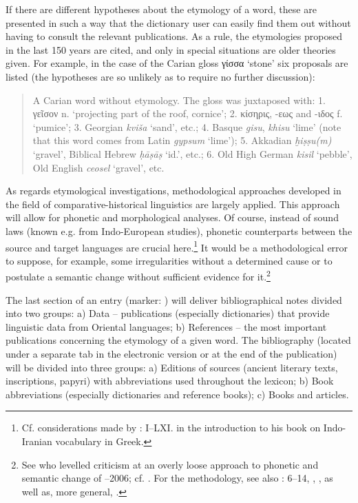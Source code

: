 \documentclass[output=paper,colorlinks,citecolor=brown,arabicfont,chinesefont]{langscibook}
\begin{document}
If there are different hypotheses about the etymology of a word, these are presented in such a way that the dictionary user can easily find them out without having to consult the relevant publications. As a rule, the etymologies proposed in the last 150 years are cited, and only in special situations are older theories given. For example, in the case of the Carian gloss γίσσα ‘stone’ six proposals are listed (the hypotheses are so unlikely as to require no further discussion):

\begin{quote}
     A Carian word without etymology. The gloss was juxtaposed with: 1. γεῖσον n. ‘projecting part of the roof, cornice’; 2. κίσηρις, -εως and -ιδος f. ‘pumice’; 3. Georgian \emph{kviša} ‘sand’, etc.; 4. Basque \emph{gisu}, \emph{khisu} ‘lime’ (note that this word comes from Latin \emph{gypsum} ‘lime’); 5. Akkadian \emph{ḫiṣṣu(m)} ‘gravel’, Biblical Hebrew \emph{ḥāṣāṣ} ‘id.’, etc.; 6. Old High German \emph{kisil} ‘pebble’, Old English \emph{ceosel} ‘gravel’, etc.
\end{quote}

As regards etymological investigations, methodological approaches developed in the field of comparative-historical linguistics are largely applied. This approach will allow for phonetic and morphological analyses. Of course, instead of sound laws (known e.g. from Indo-European studies), phonetic counterparts between the source and target languages are crucial here.\footnote{Cf. considerations made by \citealt{Brust2008}:  I–LXI. in the introduction to his book on Indo-Iranian vocabulary in Greek.}  It would be a methodological error to suppose, for example, some irregularities without a determined cause or to postulate a semantic change without sufficient evidence for it.\footnote{See \citealt{JasanoffNussbaum1996}  who levelled criticism at an overly loose approach to phonetic and semantic change of \citealt{Bernal1987} –2006; cf. \citealt{Nardelli2013} . For the methodology, see also \citealt{Hoch1994}:  6–14, \citealt{Griffith1997},   \citealt[1--91]{Ciancaglini2008}, as well as, more general, \citealt{ThomasonKaufmann1988}.}

The last section of an entry (marker: ) will deliver bibliographical notes divided into two groups: a) Data – publications (especially dictionaries) that provide linguistic data from Oriental languages; b) References – the most important publications concerning the etymology of a given word. The bibliography (located under a separate tab in the electronic version or at the end of the publication) will be divided into three groups: a) Editions of sources (ancient literary texts, inscriptions, papyri) with  abbreviations used throughout the lexicon; b) Book abbreviations (especially dictionaries and reference books); c) Books and articles.
\end{document}
